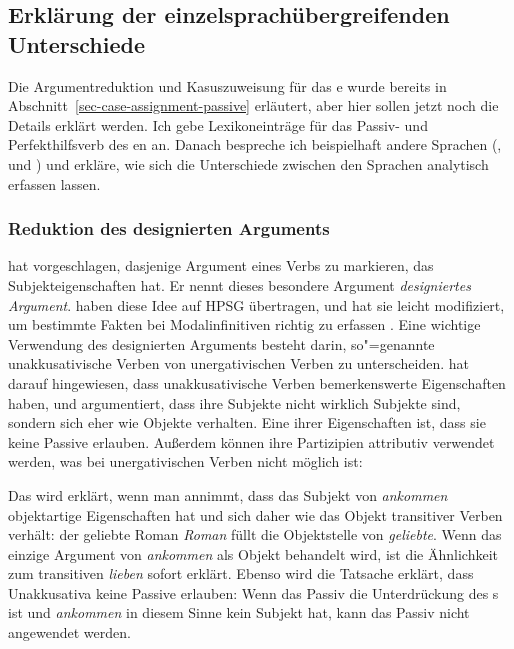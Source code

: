 

\subsection{Erklärung der einzelsprachübergreifenden Unterschiede}

Die Argumentreduktion und Kasuszuweisung für das e wurde bereits in
Abschnitt~\ref{sec-case-assignment-passive} erläutert, aber hier sollen jetzt noch die Details
erklärt werden. Ich gebe Lexikoneinträge für das Passiv- und Perfekthilfsverb des en
an. Danach bespreche ich beispielhaft andere Sprachen (,  und
) und erkläre, wie sich die Unterschiede zwischen den Sprachen analytisch erfassen lassen.

\subsubsection{Reduktion des designierten Arguments}

\citet[]{Haider86} hat vorgeschlagen, dasjenige Argument eines Verbs zu markieren, das Subjekteigenschaften hat. Er nennt
dieses besondere Argument \emph{designiertes Argument}. \citet{HM94a} haben diese Idee auf HPSG übertragen, und
\citet{Mueller2003e} hat sie leicht modifiziert, um bestimmte Fakten bei Modalinfinitiven
richtig zu erfassen \citep[siehe auch][Abschnitt~16.2.3]{MuellerLehrbuch4}. Eine wichtige Verwendung des designierten Arguments besteht darin, so"=genannte
unakkusativische Verben von unergativischen Verben zu unterscheiden. \citet{Perlmutter78} hat darauf hingewiesen, dass unakkusativische Verben
bemerkenswerte Eigenschaften haben, und argumentiert, dass ihre Subjekte nicht wirklich Subjekte sind, sondern sich eher
wie Objekte verhalten. Eine ihrer Eigenschaften ist, dass sie keine Passive erlauben. Außerdem können ihre
Partizipien attributiv verwendet werden, was bei unergativischen Verben nicht möglich ist:

\eal
{}
\zl

\noindent
Das wird erklärt, wenn man annimmt, dass das Subjekt von \emph{ankommen} objektartige
Eigenschaften hat und sich daher wie das Objekt transitiver Verben verhält:
\ea
der geliebte Roman
\z
\emph{Roman} füllt die Objektstelle von \emph{geliebte}. Wenn das einzige Argument von \emph{ankommen}
als Objekt behandelt wird, ist die Ähnlichkeit zum transitiven \emph{lieben} sofort
erklärt. Ebenso wird die Tatsache erklärt, dass Unakkusativa keine Passive erlauben: Wenn
das Passiv die Unterdrückung des s ist und \emph{ankommen} in diesem Sinne kein Subjekt hat, kann das
Passiv nicht angewendet werden.

